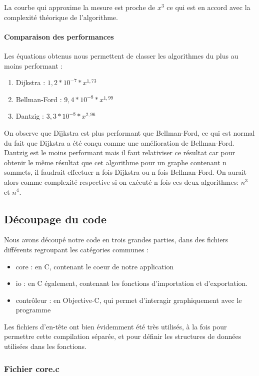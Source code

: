 \documentclass[a4paper,12pt,final] {article}
\begin{document}
La courbe qui approxime la mesure est proche de $x^{3}$ ce qui est en accord avec la complexité théorique de l'algorithme.
\paragraph{Comparaison des performances}
Les équations obtenus nous permettent de classer les algorithmes du plus au moins performant :
\begin{enumerate}
\item Dijkstra :  $1,2*10^{-7}*x^{1,73}$
\item Bellman-Ford :  $9,4*10^{-8}*x^{1,99}$
\item Dantzig : $3,3*10^{-8}*x^{2,96}$
\end{enumerate}
On observe que Dijkstra est plus performant que Bellman-Ford, ce qui est normal du fait que Dijkstra a été con\c cu comme une amélioration de Bellman-Ford.\\

Dantzig est le moins performant mais il faut relativiser ce résultat car pour obtenir le même résultat que cet algorithme pour un graphe contenant n sommets, il faudrait effectuer n fois Dijkstra ou n fois Bellman-Ford. On aurait alors comme complexité respective si on exécuté n fois ces deux algorithmes: $n^{3}$ et $n^{4}$.

\subsection{Découpage du code}

Nous avons découpé notre code en trois grandes parties, dans des fichiers différents regroupant les catégories communes :

\begin{itemize}
\item{core} : en C, contenant le coeur de notre application
\item{io} : en C également, contenant les fonctions d'importation et d'exportation.
\item{contrôleur} : en Objective-C, qui permet d'interagir graphiquement avec le programme
\end{itemize}

Les fichiers d'en-tête ont bien évidemment été très utilisés, à la fois pour permettre cette compilation séparée, et pour définir les structures de données utilisées dans les fonctions.\\

\subsubsection{Fichier core.c}
\end{document}
